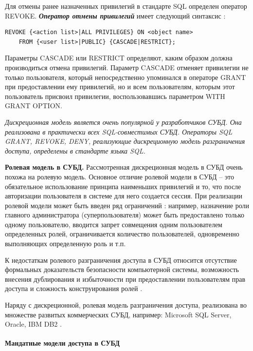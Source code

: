 Для отмены ранее назначенных привилегий в стандарте SQL определен оператор REVOKE. \textit{\textbf{Оператор отмены 
привилегий}} имеет следующий синтаксис \autocite{Skakun}:
\begin{lstlisting}[]
REVOKE {<action list>|ALL PRIVILEGES} ON <object name>
    FROM {<user list>|PUBLIC} {CASCADE|RESTRICT};
\end{lstlisting}
Параметры CASCADE или RESTRICT определяют, каким образом должна производиться отмена привилегий. Параметр 
CASCADE отменяет привилегии не только пользователя, который непосредственно упоминался в операторе GRANT при 
предоставлении ему привилегий, но и всем пользователям, которым этот пользователь присвоил привилегии,
воспользовавшись параметром WITH GRANT OPTION.

\textit{Дискреционная модель является очень популярной у разработчиков СУБД. Она реализована в практически всех 
SQL-совместимых СУБД. Операторы SQL GRANT, REVOKE, DENY, реализующие дискреционную модель разграничения 
доступа, определены в стандарте языка SQL.}

\textbf{Ролевая модель в СУБД.} Рассмотренная дискреционная модель в СУБД очень похожа на ролевую модель. 
Основное отличие ролевой модели в СУБД -- это обязательное использование принципа наименьших привилегий 
и то, что после авторизации пользователя в системе для него создается сессия. При реализации ролевой 
модели может быть введен ряд ограничений \autocite{Skakun}: например, назначение роли главного администратора 
(суперпользователя) может быть предоставлено только одному пользователю, вводится запрет совмещения одним 
пользователем определенных ролей, ограничивается количество пользователей, одновременно выполняющих определенную 
роль и т.п.

К недостаткам ролевого разграничения доступа в СУБД относится отсутствие формальных доказательств безопасности 
компьютерной системы, возможность внесения дублирования и избыточности при предоставлении пользователям прав 
доступа и сложность конструирования ролей \autocite{Skakun}.

Наряду с дискреционной, ролевая модель разграничения доступа, реализована во множестве развитых коммерческих 
СУБД, например: Microsoft SQL Server, Oracle, IBM DB2 \autocite{Skakun}.

\paragraph{Мандатные модели доступа в СУБД}

